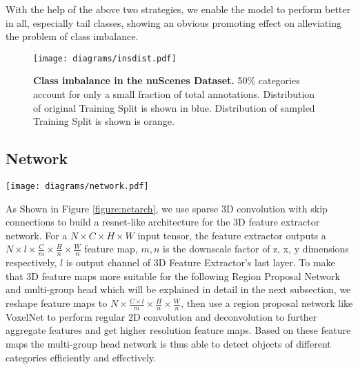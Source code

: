 \documentclass[10pt,twocolumn,letterpaper]{article}
\begin{document}
With the help of the above two strategies, we enable the model to perform better in all, especially tail classes, showing an obvious promoting effect on alleviating the problem of class imbalance.

\begin{figure}
\begin{center}
\texttt{[image: diagrams/insdist.pdf]}
\end{center}
\caption{\textbf{Class imbalance in the nuScenes Dataset.} 50\% categories account for only a small fraction of total annotations. Distribution of original Training Split is shown in blue. Distribution of sampled Training Split is shown is orange.}
\label{fig:insnumcls}
\end{figure}

\subsection{Network}

\begin{figure*}[t]
  \centering
  \texttt{[image: diagrams/network.pdf]} \\
  \caption{\textbf{Network Architecture.} 3D Feature Extractor is composed of submanifold and regular 3D sparse convolutions. Outputs of 3D Feature Extractor are of 16$\times$ downscale ratio, which are flatten along output axis and fed into following Region Proposal Network to generate 8$\times$ feature maps, followed by the multi-group head network to generate final predictions. Number of groups in head is set according to grouping specification.}
  \label{figure:netarch}
\end{figure*}

As Shown in Figure \ref{figure:netarch}, we use sparse 3D convolution with skip connections to build a resnet-like architecture for the 3D feature extractor network. For a $N \times C \times H \times W$ input tensor, the feature extractor outputs a $N \times l \times \frac{C}{m} \times \frac{H}{n} \times \frac{W}{n}$ feature map, $m, n$ is the downscale factor of z, x, y dimensions respectively, $l$ is output channel of 3D Feature Extractor's last layer. To make that 3D feature maps more suitable for the following Region Proposal Network and multi-group head which will be explained in detail in the next subsection, we reshape feature maps to $N \times \frac{C \times l}{m} \times \frac{H}{n} \times \frac{W}{n}$, then use a region proposal network like VoxelNet \cite{Zhou_2018_CVPR} to perform regular 2D convolution and deconvolution to further aggregate features and get higher resolution feature maps. Based on these feature maps the multi-group head network is thus able to detect objects of different categories efficiently and effectively. 
\end{document}
